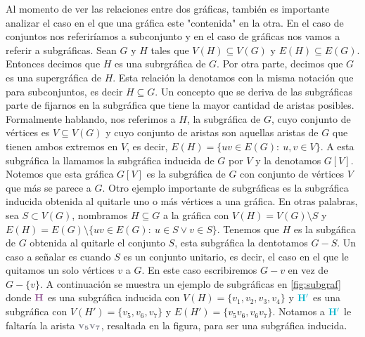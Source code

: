 Al momento de ver las relaciones entre dos gr\'aficas, tambi\'en es importante
analizar el caso en el que una gr\'afica este "contenida" en la otra. En el caso
de conjuntos nos referir\'iamos a subconjunto y en el caso de gr\'aficas nos
vamos a referir a subgr\'aficas. Sean $G$ y $H$ tales que $V(H) \subseteq V(G)$
y $E(H) \subseteq E(G)$. Entonces decimos que $H$ es una subrgr\'afica de $G$.
Por otra parte, decimos que $G$ es una supergr\'afica de $H$. Esta relaci\'on la
denotamos con la misma notaci\'on que para subconjuntos, es decir $H \subseteq
G$. Un concepto que se deriva de las subgr\'aficas parte de fijarnos en la
subgr\'afica que tiene la mayor cantidad de aristas posibles. Formalmente
hablando, nos referimos a $H$, la subgr\'afica de $G$, cuyo conjunto de
v\'ertices es $V \subseteq V(G)$ y cuyo conjunto de aristas son aquellas aristas
de $G$ que tienen ambos extremos en $V$, es decir, $E(H) = \{uv \in E(G) \colon\
u,v \in V\}$. A esta subgr\'afica la llamamos la subgr\'afica inducida de $G$
por $V$ y la denotamos $G[V]$. Notemos que esta gr\'afica $G[V]$ es la
subgr\'afica de $G$ con conjunto de v\'ertices $V$ que m\'as se parece a $G$.
Otro ejemplo importante de subgr\'aficas es la subgr\'afica inducida obtenida al
quitarle uno o m\'as v\'ertices a una gr\'afica. En otras palabras, sea $S
\subset V(G)$, nombramos $H \subseteq G$ a la gr\'afica con $V(H)=V(G) \setminus
S$ y $E(H) = E(G)\setminus\{uv \in E(G) \colon\ u \in S \lor v \in S\}$. Tenemos
que $H$ es la subg\'afica de $G$ obtenida al quitarle el conjunto $S$, esta
subgr\'afica la dentotamos $G-S$. Un caso a se\~{n}alar es cuando $S$ es un
conjunto unitario, es decir, el caso en el que le quitamos un solo v\'ertices
$v$ a $G$. En este caso escribiremos $G-v$ en vez de $G-\{v\}$. A continuaci\'on
se muestra un ejemplo de subgr\'aficas en \cref{fig:subgraf} donde
${\color{morado}\bf H}$ es una subgr\'afica inducida con $V(H) =
\{v_1,v_2,v_3,v_4\}$ y ${\color{azulCielo}\bf H'}$ es una subgr\'afica con
$V(H')=\{v_5,v_6,v_7\}$ y $E(H')=\{v_5v_6,  v_6v_7\}$. Notamos a
${\color{azulCielo}\bf H'}$ le faltar\'ia la arista ${\color{grisOscuro!80}\bf
v_5v_7}$, resaltada en la figura, para ser una subgr\'afica inducida. 


